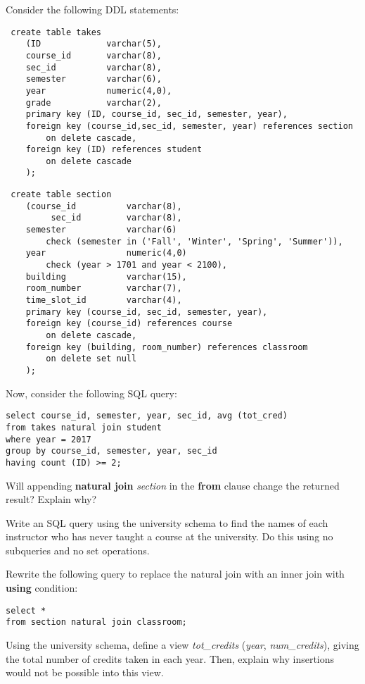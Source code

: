 \documentclass[a4 paper]{article}
\begin{document}
Consider the following DDL statements:
\begin{verbatim}
 create table takes
    (ID             varchar(5), 
    course_id       varchar(8),
    sec_id          varchar(8), 
    semester        varchar(6),
    year            numeric(4,0),
    grade           varchar(2),
    primary key (ID, course_id, sec_id, semester, year),
    foreign key (course_id,sec_id, semester, year) references section
        on delete cascade,
    foreign key (ID) references student
        on delete cascade
    );
\end{verbatim}
\begin{verbatim}
 create table section
    (course_id          varchar(8), 
         sec_id         varchar(8),
    semester            varchar(6)
        check (semester in ('Fall', 'Winter', 'Spring', 'Summer')), 
    year                numeric(4,0) 
        check (year > 1701 and year < 2100), 
    building            varchar(15),
    room_number         varchar(7),
    time_slot_id        varchar(4),
    primary key (course_id, sec_id, semester, year),
    foreign key (course_id) references course
        on delete cascade,
    foreign key (building, room_number) references classroom
        on delete set null
    );
\end{verbatim}

\noindent Now, consider the following SQL query:
\begin{verbatim}
select course_id, semester, year, sec_id, avg (tot_cred)
from takes natural join student
where year = 2017
group by course_id, semester, year, sec_id
having count (ID) >= 2;
\end{verbatim}

\noindent Will appending \textbf{natural join} \emph{section} in the \textbf{from} clause change the returned result? Explain why?



Write an SQL query using the university schema to find the names of each instructor who has never taught a course at the university. Do this using no subqueries and no set operations.



\color{black}
Rewrite the following query to replace the natural join with an inner join with \textbf{using} condition:
\begin{verbatim}
select *
from section natural join classroom;
\end{verbatim}


Using the university schema, define a view \emph{tot\_credits} (\emph{year}, \emph{num\_credits}), giving the total number of credits taken in each year. Then, explain why insertions would not be possible into this view.
\end{document}
